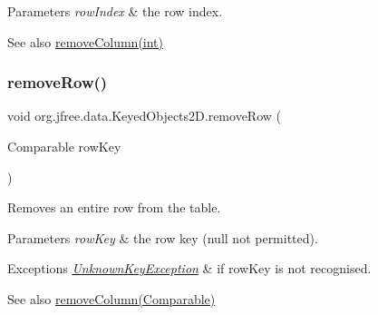 \begin{DoxyParams}{Parameters}
{\em row\+Index} & the row index.\\
\hline
\end{DoxyParams}
\begin{DoxySeeAlso}{See also}
\mbox{\hyperlink{classorg_1_1jfree_1_1data_1_1_keyed_objects2_d_a5c8fb22f412dab0f50a762d2676818d3}{remove\+Column(int)}} 
\end{DoxySeeAlso}
\mbox{\label{classorg_1_1jfree_1_1data_1_1_keyed_objects2_d_a98a8ebeb70498799f225190f73e18fa0}} 
\subsubsection{\texorpdfstring{remove\+Row()}{removeRow()}\hspace{0.1cm}{\footnotesize\ttfamily [2/2]}}
{\footnotesize\ttfamily void org.\+jfree.\+data.\+Keyed\+Objects2\+D.\+remove\+Row (\begin{DoxyParamCaption}\item[{Comparable}]{row\+Key }\end{DoxyParamCaption})}

Removes an entire row from the table.


\begin{DoxyParams}{Parameters}
{\em row\+Key} & the row key ({\ttfamily null} not permitted).\\
\hline
\end{DoxyParams}

\begin{DoxyExceptions}{Exceptions}
{\em \mbox{\hyperlink{classorg_1_1jfree_1_1data_1_1_unknown_key_exception}{Unknown\+Key\+Exception}}} & if {\ttfamily row\+Key} is not recognised.\\
\hline
\end{DoxyExceptions}
\begin{DoxySeeAlso}{See also}
\mbox{\hyperlink{classorg_1_1jfree_1_1data_1_1_keyed_objects2_d_a488bbadbf49f3b5b35d6cc6add250f68}{remove\+Column(\+Comparable)}} 
\end{DoxySeeAlso}
\mbox{\label{classorg_1_1jfree_1_1data_1_1_keyed_objects2_d_ace242922a4ef60668a61d137fd1cd7d0}} 
